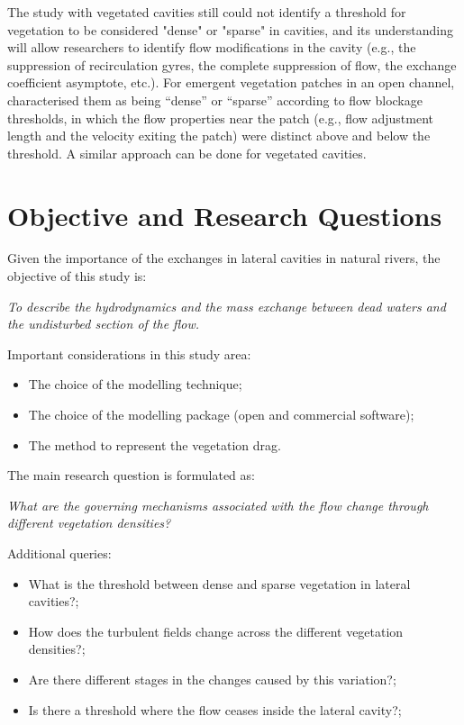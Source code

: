 The study with vegetated cavities still could not identify a threshold for vegetation to be considered "dense" or "sparse" in cavities, and its understanding will allow researchers to identify flow modifications in the cavity (e.g., the suppression of recirculation gyres, the complete suppression of flow, the exchange coefficient asymptote, etc.).  For emergent vegetation patches in an open channel, \textcite{chen2012} characterised them as being “dense” or “sparse” according to flow blockage thresholds, in which the flow properties near the patch (e.g., flow adjustment length and the velocity exiting the patch) were distinct above and below the threshold. A similar approach can be done for vegetated cavities. 
\section{Objective and Research Questions}
Given the importance of the exchanges in lateral cavities in natural rivers, the objective of this study is:

\textit{To describe the hydrodynamics and the mass exchange between dead waters and the undisturbed section of the flow.}

Important considerations in this study area:
\begin{itemize}[noitemsep,topsep=0pt,align=left,itemindent=\parindent]
    \item The choice of the modelling technique;
    \item The choice of the modelling package (open and commercial software);
    \item The method to represent the vegetation drag.
\end{itemize}
The main research question is formulated as:

\textit{What are the governing mechanisms associated with the flow change through different vegetation densities?}

Additional queries:
\begin{itemize}[noitemsep,topsep=0pt,align=left,itemindent=\parindent]
	\item What is the threshold between dense and sparse vegetation in lateral cavities?;
    \item How does the turbulent fields change across the different vegetation densities?;
    \item Are there different stages in the changes caused by this variation?;
    \item Is there a threshold where the flow ceases inside the lateral cavity?;
\end{itemize}

